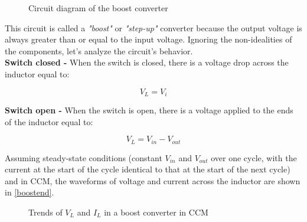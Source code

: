 \documentclass[../main.tex]{subfiles}
\begin{document}
\begin{figure}[h!]
\begin{center}



\label{boostconv}
\caption{Circuit diagram of the boost converter}	
\end{center}
\end{figure}

This circuit is called a \textit{"boost"} or \textit{"step-up"} converter because the output voltage is always greater than or equal to the input voltage. 
Ignoring the non-idealities of the components, let’s analyze the circuit’s behavior.\\

\textbf{Switch closed -} When the switch is closed, there is a voltage drop across the inductor equal to:

\begin{equation}
	V_L = V_i
\end{equation}


\textbf{Switch open -} When the switch is open, there is a voltage applied to the ends of the inductor equal to:

\begin{equation}
	V_L = V_{in} - V_{out}
\end{equation}

Assuming steady-state conditions (constant $V_{in}$ and $V_{out}$ over one cycle, with the current at the start of the cycle identical to that at the start of the next cycle) and in CCM, the waveforms of voltage and current across the inductor are shown in \autoref{boostend}.

\begin{figure}[h!]
\begin{center}


\label{boostend}
\caption{Trends of $V_L$ and $I_L$ in a boost converter in CCM}	
\end{center}
\end{figure}
\end{document}
